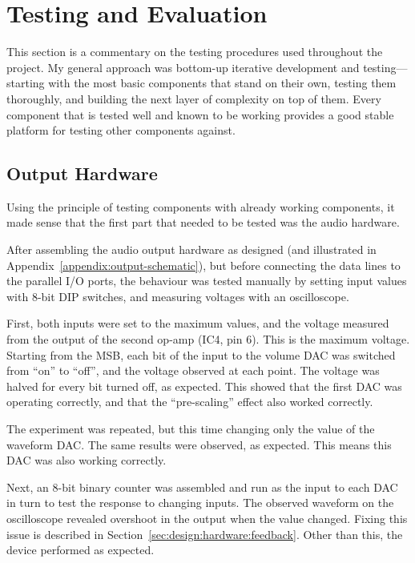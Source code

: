 \chapter{Testing and Evaluation}
\label{sec:testing}

This section is a commentary on the testing procedures used throughout the project.  My general 
approach was bottom-up iterative development and testing---starting with the most basic components 
that stand on their own, testing them thoroughly, and building the next layer of complexity on top 
of them.  Every component that is tested well and known to be working provides a good stable 
platform for testing other components against.

\section{Output Hardware}
\label{sec:testing:hardware}

Using the principle of testing components with already working components, it made sense that the 
first part that needed to be tested was the audio hardware.

After assembling the audio output hardware as designed (and illustrated in 
Appendix~\ref{appendix:output-schematic}), but before connecting the data lines to the parallel I/O 
ports, the behaviour was tested manually by setting input values with 8-bit DIP switches, and 
measuring voltages with an oscilloscope.

First, both inputs were set to the maximum values, and the voltage measured from the output of the 
second op-amp (IC4, pin 6).  This is the maximum voltage.  Starting from the MSB, each bit of the 
input to the volume DAC was switched from ``on'' to ``off'', and the voltage observed at each point.  
The voltage was halved for every bit turned off, as expected.  This showed that the first DAC was 
operating correctly, and that the ``pre-scaling'' effect also worked correctly.

The experiment was repeated, but this time changing only the value of the waveform DAC.  The same 
results were observed, as expected.  This means this DAC was also working correctly.

Next, an 8-bit binary counter was assembled and run as the input to each DAC in turn to test the 
response to changing inputs.  The observed waveform on the oscilloscope revealed overshoot in the 
output when the value changed.  Fixing this issue is described in 
Section~\ref{sec:design:hardware:feedback}.  Other than this, the device performed as expected.

